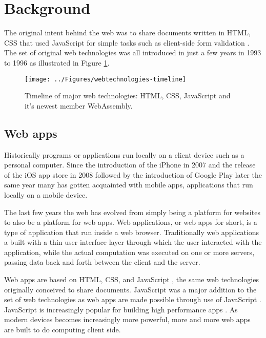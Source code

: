 \section{Background}
\label{background}

The original intent behind the web was to share documents written in HTML, CSS that used JavaScript for simple tasks such as client-side form validation \parencite{Zakai2018,Moller2018}. The set of original web technologies was all introduced in just a few years in 1993 to 1996 as illustrated in Figure \ref{figure:webtechnologies-timeline}.


\begin{figure}[!h]
\centering
\texttt{[image: ../Figures/webtechnologies-timeline]}
\caption{Timeline of major web technologies: HTML, CSS, JavaScript and it's newest member WebAssembly.}
\label{figure:webtechnologies-timeline}
\end{figure}

\subsection{Web apps}

Historically programs or applications run locally on a client device such as a personal computer. Since the introduction of the iPhone in 2007 and the release of the iOS app store in 2008 followed by the introduction of Google Play later the same year many %
has gotten acquainted with mobile apps, applications that run locally on a mobile device.

The last few years the web has evolved from simply being a platform for websites to also be a platform for web apps. Web applications, or web apps for short, is a type of application that run inside a web browser. Traditionally web applications a built with a thin user interface layer through which the user interacted with the application, while the actual computation was executed on one or more servers, %
passing data back and forth between the client and the server.

Web apps are based on HTML, CSS, and JavaScript \parencite{ParkJungMoon2015}, the same web technologies originally conceived to share documents. JavaScript was a major addition to the set of web technologies as web apps are made possible through use of JavaScript \parencite{ParkJungMoon2015}. JavaScript is increasingly popular for building high performance apps \parencite{SandhuHerreraHendren2018}. As modern devices becomes increasingly more powerful, more and more web apps are built to do computing client side.

